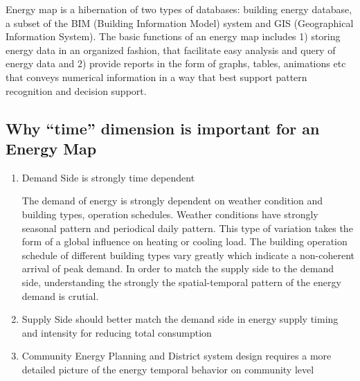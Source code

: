 \documentclass[12pt]{article}
\begin{document}
Energy map is a hibernation of two types of databases: building energy
database, a subset of the BIM (Building Information Model) system and
GIS (Geographical Information System). The basic functions of an
energy map includes 1) storing energy data in an organized fashion,
that facilitate easy analysis and query of energy data and 2) provide
reports in the form of graphs, tables, animations etc that conveys
numerical information in a way that best support pattern recognition
and decision support.

\subsection{Why ``time'' dimension is important for an Energy Map}
\begin{enumerate}[label*=\arabic*.]
\item Demand Side is strongly time dependent

  The demand of energy is strongly dependent on weather condition and
  building types, operation schedules. Weather conditions have
  strongly seasonal pattern and periodical daily pattern. This type of
  variation takes the form of a global influence on heating or cooling
  load. The building operation schedule of different building types
  vary greatly which indicate a non-coherent arrival of peak
  demand. In order to match the supply side to the demand side,
  understanding the strongly the spatial-temporal pattern of the
  energy demand is crutial.

\item Supply Side should better match the demand side in energy supply
  timing and intensity for reducing total consumption

  \begin{comment}
  Mark!!!!!!
  The major energy source used in the building sector are electricity
  and natural gas: 3559 tBtu (55\%) electricity and 2100 tBtu (32\%)
  natural gas were consumed for the commertial building sector,
  ~\cite{CBECS2003}. In RECS 2009, the space heating (42\%) and
  lighting and appliances (30\%) accounted for over 70\% of
  residential energy consumption~\cite{HomeEnergyEIA2015}.

  \par As the result of the finiteness of fossil fuels, the using of
  renewable energy begins to come into play. In 2013, renewable energy
  account for 9\% of the residential and commercial primary energy
  source~\cite{EIAPrimary2013}.
  \end{comment}
  
\item Community Energy Planning and District system design
  requires a more detailed picture of the energy temporal behavior
  on community level
\end{enumerate}
\end{document}

